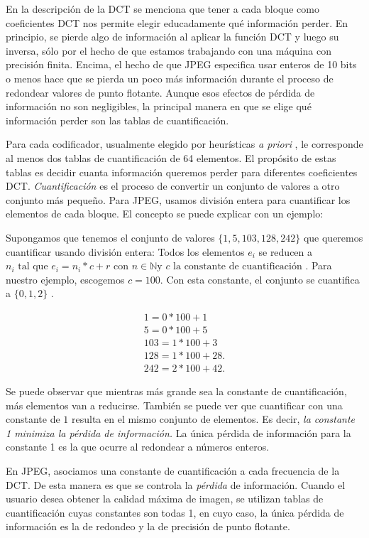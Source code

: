 En la descripción de la DCT se menciona que tener a cada bloque como
coeficientes DCT nos permite elegir educadamente qué información perder. En
principio, se pierde algo de información al aplicar la función DCT y luego su
inversa, sólo por el hecho de que estamos trabajando con una máquina con
precisión finita. Encima, el hecho de que JPEG especifica usar enteros de 10
bits o menos hace que se pierda un poco más información durante el proceso de
redondear valores de punto flotante. Aunque esos efectos de pérdida de
información no son negligibles, la principal manera en que se elige qué
información perder son las \gls{tablas de cuantificación}.

Para cada codificador, usualmente elegido por heurísticas \emph{ a priori }, le
corresponde al menos dos tablas de cuantificación de 64 elementos. El propósito
de estas tablas es decidir cuanta información queremos perder para diferentes
coeficientes DCT. \emph{Cuantificación} es el proceso de convertir un conjunto
de valores a otro conjunto más pequeño. Para JPEG, usamos división entera para
cuantificar los elementos de cada bloque. El concepto se puede explicar con un
ejemplo:

Supongamos que tenemos el conjunto de valores $ \{ 1, 5, 103, 128, 242 \} $ que
queremos cuantificar usando división entera: Todos los elementos $e_i$ se
reducen a $ n_i \text{ tal que } e_i = n_i * c + r \text{ con } n \in ℕ \text{
y } c \text{ la constante de cuantificación }$. Para nuestro ejemplo, escogemos
$ c = 100 $. Con esta constante, el conjunto se cuantifica a $ \{ 0, 1, 2 \}$ .

\begin{eqnarray*}
    1 = 0 * 100 + 1 \\
    5 = 0 * 100 + 5 \\
    103 = 1 * 100 + 3 \\
    128 = 1 * 100 + 28. \\
    242 = 2 * 100 + 42.
\end{eqnarray*}

Se puede observar que mientras más grande sea la constante de cuantificación,
más elementos van a reducirse. También se puede ver que cuantificar con una
constante de $1$ resulta en el mismo conjunto de elementos. Es decir, \emph{ la
constante 1 minimiza la pérdida de información.} La única pérdida de
información para la constante 1 es la que ocurre al redondear a números
enteros.

En JPEG, asociamos una constante de cuantificación a cada frecuencia de la DCT.
De esta manera es que se controla la \emph{pérdida} de información. Cuando el
usuario desea obtener la calidad máxima de imagen, se utilizan tablas de
cuantificación cuyas constantes son todas 1, en cuyo caso, la única pérdida de
información es la de redondeo y la de precisión de punto flotante.

